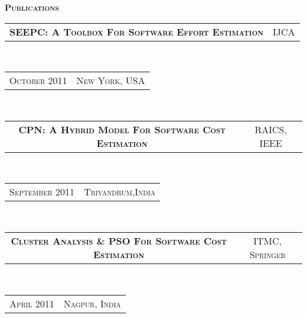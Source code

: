 \documentclass[10pt,a4paper,oneside]{article}
\begin{document}
\begin{minipage}[t]{0.63\textwidth}
\begin{adjustwidth}{7pt}{0pt}
        \end{adjustwidth}
        \textcolor{light-gray}{\textbf{\large P\textsc{ublications}}}
        \vspace{10pt}\\
        \begin{tabular}{c|c}
            \textbf{\normalsize SEEPC: A T\textsc{oolbox}
            F\textsc{or} S\textsc{oftware} E\textsc{ffort}
        E\textsc{stimation}}
            &\textmd{\normalsize IJCA}
        \end{tabular}\\
        \textcolor{light-gray}{
            \begin{tabular}{c|c}
                {\small O\textsc{ctober 2011}}
                &{\small N\textsc{ew} Y\textsc{ork}, USA}
            \end{tabular}
        \vspace{10pt}
        }\\ 
        \begin{tabular}{c|c}
            \textbf{\normalsize CPN: A H\textsc{ybrid}
            M\textsc{odel} F\textsc{or} S\textsc{oftware}
        C\textsc{ost} E\textsc{stimation}}
            &\textmd{\normalsize RAICS, IEEE}
        \end{tabular}\\
        \textcolor{light-gray}{
            \begin{tabular}{c|c}
                {\small S\textsc{eptember 2011}}
                &{\small T\textsc{rivandrum},I\textsc{ndia}}
            \end{tabular}
            \vspace{10pt}
        }\\ 
        \begin{tabular}{c|c}
            \textbf{\normalsize C\textsc{luster} A\textsc{nalysis} \& PSO F\textsc{or} S\textsc{oftware} C\textsc{ost} E\textsc{stimation}}
            &\textmd{\normalsize ITMC, S\textsc{pringer}}
        \end{tabular}\\
        \textcolor{light-gray}{
            \begin{tabular}{c|c}
                {\small A\textsc{pril 2011}}
                &{\small N\textsc{agpur}, I\textsc{ndia}}
            \end{tabular}
        }\\ 
    \end{minipage}
    \hspace{2ex}
\end{document}
